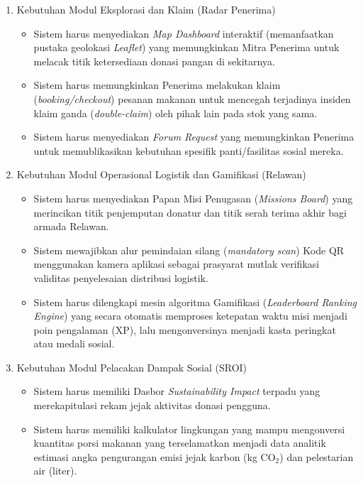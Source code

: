 \begin{enumerate}
    \item Kebutuhan Modul Eksplorasi dan Klaim (Radar Penerima)
    \begin{itemize}
        \item Sistem harus menyediakan \textit{Map Dashboard} interaktif (memanfaatkan pustaka geolokasi \textit{Leaflet}) yang memungkinkan Mitra Penerima untuk melacak titik ketersediaan donasi pangan di sekitarnya.
        \item Sistem harus memungkinkan Penerima melakukan klaim (\textit{booking/checkout}) pesanan makanan untuk mencegah terjadinya insiden klaim ganda (\textit{double-claim}) oleh pihak lain pada stok yang sama.
        \item Sistem harus menyediakan \textit{Forum Request} yang memungkinkan Penerima untuk memublikasikan kebutuhan spesifik panti/fasilitas sosial mereka.
    \end{itemize}

    \item Kebutuhan Modul Operasional Logistik dan Gamifikasi (Relawan)
    \begin{itemize}
        \item Sistem harus menyediakan Papan Misi Penugasan (\textit{Missions Board}) yang merincikan titik penjemputan donatur dan titik serah terima akhir bagi armada Relawan.
        \item Sistem mewajibkan alur pemindaian silang (\textit{mandatory scan}) Kode QR menggunakan kamera aplikasi sebagai prasyarat mutlak verifikasi validitas penyelesaian distribusi logistik.
        \item Sistem harus dilengkapi mesin algoritma Gamifikasi (\textit{Leaderboard Ranking Engine}) yang secara otomatis memproses ketepatan waktu misi menjadi poin pengalaman (XP), lalu mengonversinya menjadi kasta peringkat atau medali sosial.
    \end{itemize}

    \item Kebutuhan Modul Pelacakan Dampak Sosial (SROI)
    \begin{itemize}
        \item Sistem harus memiliki Dasbor \textit{Sustainability Impact} terpadu yang merekapitulasi rekam jejak aktivitas donasi pengguna.
        \item Sistem harus memiliki kalkulator lingkungan yang mampu mengonversi kuantitas porsi makanan yang terselamatkan menjadi data analitik estimasi angka pengurangan emisi jejak karbon (kg CO$_2$) dan pelestarian air (liter).
    \end{itemize}


\end{enumerate}
